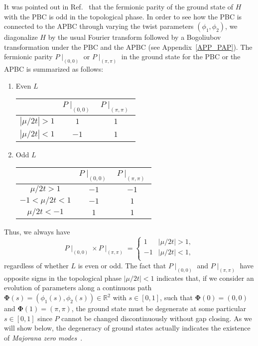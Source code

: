 \documentclass[aps, prb, showpacs, twocolumn, %
amssymb,superscriptaddress]{revtex4}
\begin{document}
It was pointed out in Ref.~ that the fermionic parity of the ground state of $H$ with the PBC is %
odd in the topological phase.  
In order to see how the PBC is connected to the APBC through varying the twist parameters $(\phi_1,\phi_2)$, we diagonalize $H$ by the usual Fourier transform followed by a Bogoliubov transformation under the PBC and the APBC (see Appendix~\ref{APP_PAP}). The fermionic parity $P\mid_{(0,0)}$ or $P\mid_{(\pi,\pi)}$ in the ground state for the PBC or the APBC is summarized as follows:
\begin{enumerate}
\item Even $L$
\begin{center}
\begin{tabular}{ c | c  c } 
\ & $P\mid_{(0,0)}$ & $P\mid_{(\pi,\pi)}$  \\ \hline
$\left\lvert \mu/2t \right\rvert>1$ & $1$ & $1$ \\ 
$ \left\lvert \mu/2t \right\rvert<1$ & $-1$ & $1$ \\ 
\end{tabular}
\end{center}
\item Odd $L$
\begin{center}
\begin{tabular}{ c | c  c } 
\ & $P\mid_{(0,0)}$ & $P\mid_{(\pi,\pi)}$  \\ \hline
$\mu/2t >1$ & $-1$ & $-1$ \\ 
$-1 < \mu/2t <1$ & $-1$ & $1$ \\ 
$\mu/2t  <-1$ & $1$ & $1$ \\ 
\end{tabular}
\end{center}
\end{enumerate}

Thus, we always have
\begin{equation}
P\mid_{(0,0)}\times P\mid_{(\pi, \pi)}=
\begin{cases}
1 & \left\lvert \mu/2t \right\rvert>1,\\
-1 & \left\lvert \mu/2t \right\rvert<1,\\
\end{cases}
	\label{eq:SpecIntersection}
\end{equation}
regardless of whether $L$ is even or odd. The fact that $P\mid_{(0,0)}$ and $P\mid_{(\pi, \pi)}$ have opposite signs in the topological phase $\left\lvert \mu/2t \right\rvert<1$ indicates that, if we consider an evolution of parameters along a continuous path $\mathbf{\Phi} \left( s \right) =(\phi_1(s),\phi_2(s))\in \mathbb{R}^{2}$ with $s \in \left[ 0, 1 \right]$, such that $\mathbf{\Phi} \left( 0 \right) =\left( 0,0 \right)$ and $\mathbf{\Phi} \left( 1 \right) = \left( \pi,\pi \right)$, the ground state must be degenerate at some particular $s \in \left[ 0, 1 \right]$ since $P$ cannot be changed discontinuously without gap closing. As we will show below, the degeneracy of ground states actually indicates the existence of {\it Majorana zero modes}~\cite{Beenakker-13, Ortiz-14, Hegde-16}.
\end{document}
